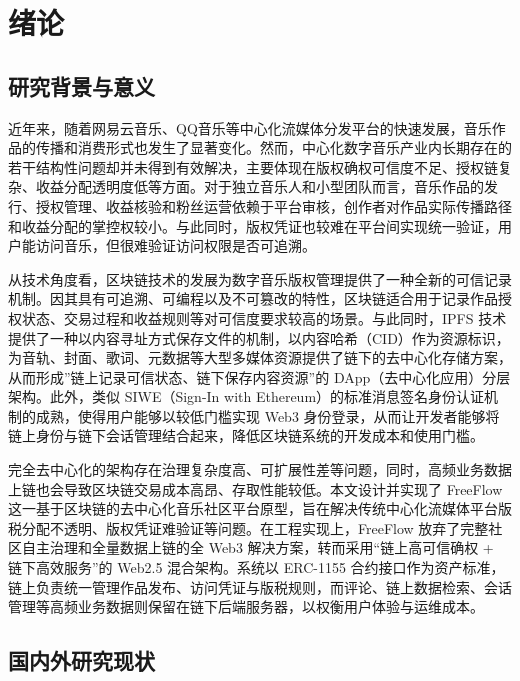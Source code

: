 \chapter{绪论}


\section{研究背景与意义}

近年来，随着网易云音乐、QQ音乐等中心化流媒体分发平台的快速发展，音乐作品的传播和消费形式也发生了显著变化。然而，中心化数字音乐产业内长期存在的若干结构性问题却并未得到有效解决，主要体现在版权确权可信度不足、授权链复杂、收益分配透明度低等方面。对于独立音乐人和小型团队而言，音乐作品的发行、授权管理、收益核验和粉丝运营依赖于平台审核，创作者对作品实际传播路径和收益分配的掌控权较小。与此同时，版权凭证也较难在平台间实现统一验证\cite{Torbensen2019,Arenal2024}，用户能访问音乐，但很难验证访问权限是否可追溯。

从技术角度看，区块链技术的发展为数字音乐版权管理提供了一种全新的可信记录机制。因其具有可追溯、可编程以及不可篡改的特性，区块链适合用于记录作品授权状态、交易过程和收益规则等对可信度要求较高的场景。与此同时，IPFS 技术提供了一种以内容寻址方式保存文件的机制，以内容哈希（CID）作为资源标识，为音轨、封面、歌词、元数据等大型多媒体资源提供了链下的去中心化存储方案，从而形成”链上记录可信状态、链下保存内容资源”的 DApp（去中心化应用）分层架构。此外，类似 SIWE（Sign-In with Ethereum）的标准消息签名身份认证机制的成熟，使得用户能够以较低门槛实现 Web3 身份登录，从而让开发者能够将链上身份与链下会话管理结合起来，降低区块链系统的开发成本和使用门槛\cite{ipfsDocs,eip4361}。

完全去中心化的架构存在治理复杂度高、可扩展性差等问题\cite{Torbensen2019,Arenal2024,Chen2021,Rikken2019}，同时，高频业务数据上链也会导致区块链交易成本高昂、存取性能较低\cite{Wei2022BDMSSurvey,Liu2020GasExceptions}。本文设计并实现了 FreeFlow 这一基于区块链的去中心化音乐社区平台原型，旨在解决传统中心化流媒体平台版税分配不透明、版权凭证难验证等问题。在工程实现上，FreeFlow 放弃了完整社区自主治理和全量数据上链的全 Web3 解决方案，转而采用“链上高可信确权 + 链下高效服务”的 Web2.5 混合架构。系统以 ERC-1155 合约接口作为资产标准\cite{eip1155}，链上负责统一管理作品发布、访问凭证与版税规则，而评论、链上数据检索、会话管理等高频业务数据则保留在链下后端服务器，以权衡用户体验与运维成本。


\section{国内外研究现状}


